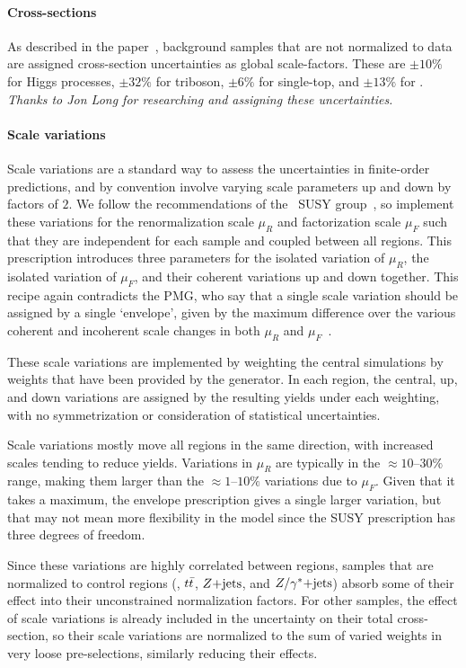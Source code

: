 \paragraph{Cross-sections}
As described in the paper~\cite{atlas2022searches},
background samples that are not normalized to data are assigned cross-section
uncertainties as global scale-factors.
These are $\pm10\%$ for Higgs processes,
$\pm32\%$ for triboson,
$\pm6\%$ for single-top,
and $\pm13\%$ for \topother.
\emph{Thanks to Jon Long for researching and assigning these uncertainties.}

\paragraph{Scale variations}
Scale variations are a standard way to assess the uncertainties in finite-order
predictions, and by convention involve varying scale parameters up and down
by factors of $2$.
We follow the recommendations of the
\atlas\ SUSY group~\cite{atlas_twiki_susytheoretical}, so implement
these variations for the
renormalization scale $\mu_R$ and factorization scale $\mu_F$ such that they
are independent for each sample and coupled between all regions.
This prescription introduces three parameters for the isolated variation of
$\mu_R$, the isolated variation of $\mu_F$, and their coherent variations
up and down together.
This recipe again contradicts the PMG, who say
that a single scale variation should be assigned by a single `envelope',
given by the maximum difference over the various coherent and incoherent scale
changes in both $\mu_R$ and $\mu_F$~\cite{atlas_twiki_pmg_theory}.

These scale variations are implemented by weighting the central simulations
by weights that have been provided by the generator.
In each region, the central, up, and down variations are assigned by the
resulting yields under each weighting, with no symmetrization or
consideration of statistical uncertainties.

Scale variations mostly move all regions in the same direction, with increased
scales tending to reduce yields.
Variations in $\mu_R$ are typically in the $\approx 10\textrm{--}30\%$ range,
making them larger than the $\approx 1\textrm{--}10\%$ variations due to
$\mu_F$.
Given that it takes a maximum, the envelope prescription gives a single larger
variation, but that may not mean more flexibility in the model since the SUSY
prescription has three degrees of freedom.

Since these variations are highly correlated between regions, samples that are
normalized to control regions (\diboson, $t\bar t$, $Z\mathrm{+jets}$, and $Z/\gamma^*\mathrm{+jets}$)
absorb some of their effect into their unconstrained normalization factors.
For other samples, the effect of scale variations is already included in
the uncertainty on their total cross-section, so their scale variations are
normalized to the sum of varied weights in very loose pre-selections,
similarly reducing their effects.

